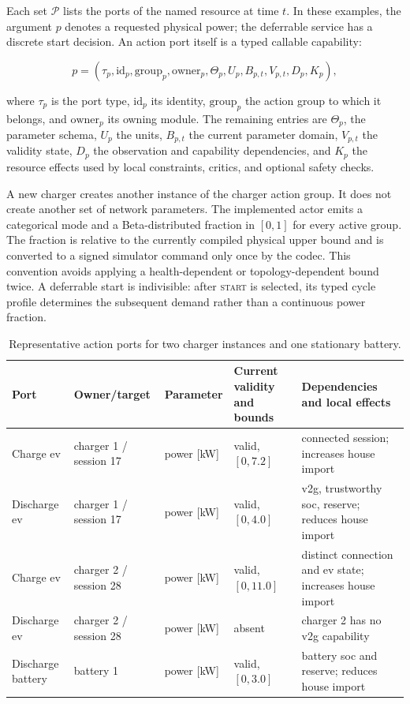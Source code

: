 Each set $\mathcal P$ lists the ports of the named resource at time $t$. In these examples, the argument $p$ denotes a requested physical power; the deferrable service has a discrete start decision. An action port itself is a typed callable capability:

\begin{equation}
p
=
\left(
\tau_p,
\mathrm{id}_p,
\mathrm{group}_p,
\mathrm{owner}_p,
\Theta_p,
U_p,
B_{p,t},
V_{p,t},
D_p,
K_p
\right),
\label{eq:action-port}
\end{equation}

where $\tau_p$ is the port type, $\mathrm{id}_p$ its identity, $\mathrm{group}_p$ the action group to which it belongs, and $\mathrm{owner}_p$ its owning module. The remaining entries are $\Theta_p$, the parameter schema, $U_p$ the units, $B_{p,t}$ the current parameter domain, $V_{p,t}$ the validity state, $D_p$ the observation and capability dependencies, and $K_p$ the resource effects used by local constraints, critics, and optional safety checks.

A new charger creates another instance of the charger action group. It does not create another set of network parameters. The implemented actor emits a categorical mode and a Beta-distributed fraction in $[0,1]$ for every active group. The fraction is relative to the currently compiled physical upper bound and is converted to a signed simulator command only once by the codec. This convention avoids applying a health-dependent or topology-dependent bound twice. A deferrable start is indivisible: after \textsc{start} is selected, its typed cycle profile determines the subsequent demand rather than a continuous power fraction.

\begin{table}[htbp]
\centering
\small
\caption{Representative action ports for two charger instances and one stationary battery.}
\label{tab:timarl-running-ports}
\begin{tabularx}{\textwidth}{@{}p{}p{}p{}p{}X@{}}
\toprule
\textbf{Port} & \textbf{Owner/target} & \textbf{Parameter} & \textbf{Current validity and bounds} & \textbf{Dependencies and local effects} \\
\midrule
Charge \gls{ev} & charger 1 / session 17 & power [kW] & valid, $[0,7.2]$ & connected session; increases house import \\
Discharge \gls{ev} & charger 1 / session 17 & power [kW] & valid, $[0,4.0]$ & \gls{v2g}, trustworthy \gls{soc}, reserve; reduces house import \\
Charge \gls{ev} & charger 2 / session 28 & power [kW] & valid, $[0,11.0]$ & distinct connection and \gls{ev} state; increases house import \\
Discharge \gls{ev} & charger 2 / session 28 & power [kW] & absent & charger 2 has no \gls{v2g} capability \\
Discharge battery & battery 1 & power [kW] & valid, $[0,3.0]$ & battery \gls{soc} and reserve; reduces house import \\
\bottomrule
\end{tabularx}
\end{table}

